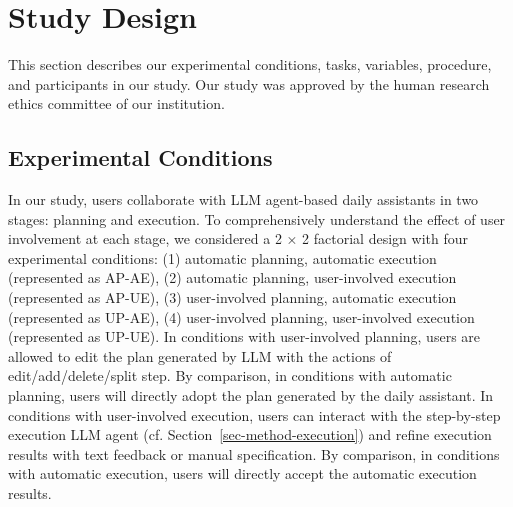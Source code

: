 \section{Study Design}

This section describes our experimental conditions, tasks,  variables, procedure, and participants in our study. {Our
study was approved by the human research ethics committee of our institution.}

\subsection{Experimental Conditions}
In our study, users collaborate with LLM agent-based daily assistants in two stages: planning and execution. 
To comprehensively understand the effect of user involvement at each stage, we considered a 2 × 2 factorial design with four experimental conditions: (1) automatic planning, automatic execution (represented as AP-AE), (2) automatic planning, user-involved execution (represented as AP-UE), (3) user-involved planning, automatic execution (represented as UP-AE), (4) user-involved planning, user-involved execution (represented as UP-UE). 
In conditions with user-involved planning, users are allowed to edit the plan generated by LLM with the actions of edit/add/delete/split step. 
By comparison, in conditions with automatic planning, users will directly adopt the plan generated by the daily assistant.
In conditions with user-involved execution, users can interact with the step-by-step execution LLM agent (cf. Section~\ref{sec-method-execution}) and refine execution results with text feedback or manual specification. 
By comparison, in conditions with automatic execution, users will directly accept the automatic execution results.


